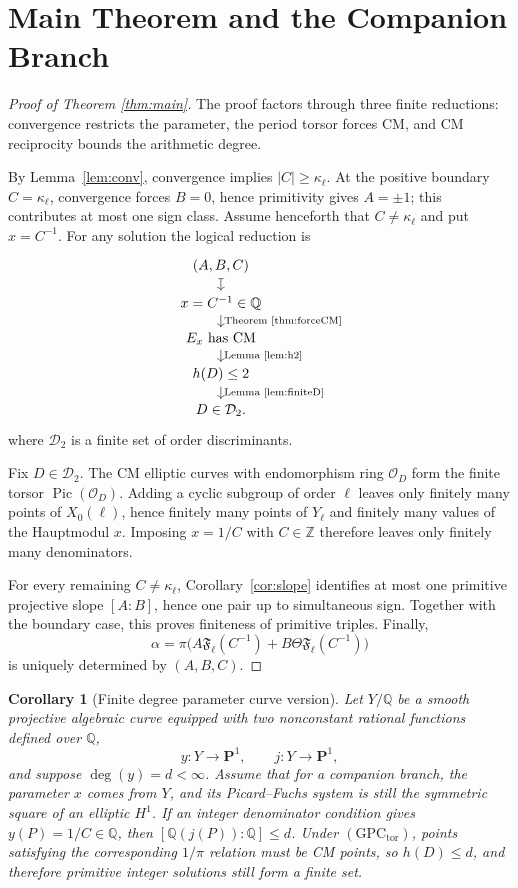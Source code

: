 \documentclass[11pt,a4paper]{amsart} %
\newtheorem{corollary}[theorem]{Corollary}
\theoremstyle{definition}
\newcommand{\Q}{\mathbb Q}
\newcommand{\Z}{\mathbb Z}
\newcommand{\Pic}{\operatorname{Pic}}
\begin{document}
\section{Main Theorem and the Companion Branch}

\begin{proof}[Proof of Theorem \ref{thm:main}]
The proof factors through three finite reductions: convergence restricts the
parameter, the period torsor forces CM, and CM reciprocity bounds the
arithmetic degree.

By Lemma~\ref{lem:conv}, convergence implies \(|C|\ge\kappa_\ell\). At the
positive boundary \(C=\kappa_\ell\), convergence forces \(B=0\), hence
primitivity gives \(A=\pm1\); this contributes at most one sign class.
Assume henceforth that \(C\ne\kappa_\ell\) and put \(x=C^{-1}\). For any
solution the logical reduction is
\[
\begin{tikzcd}[row sep=small]
(A,B,C) \arrow[d,mapsto]\\
x=C^{-1}\in\Q
  \arrow[d,"\text{Theorem~\ref{thm:forceCM}}"]\\
E_x\ \text{has CM}
  \arrow[d,"\text{Lemma~\ref{lem:h2}}"]\\
h(D)\le2
  \arrow[d,"\text{Lemma~\ref{lem:finiteD}}"]\\
D\in\mathcal D_2 .
\end{tikzcd}
\]
where \(\mathcal D_2\) is a finite set of order discriminants.

Fix \(D\in\mathcal D_2\). The CM elliptic curves with endomorphism ring
\(\mathcal O_D\) form the finite torsor \(\Pic(\mathcal O_D)\). Adding a
cyclic subgroup of order \(\ell\) leaves only finitely many points of
\(X_0(\ell)\), hence finitely many points of \(Y_\ell\) and finitely many
values of the Hauptmodul \(x\). Imposing \(x=1/C\) with \(C\in\Z\) therefore
leaves only finitely many denominators.

For every remaining \(C\ne\kappa_\ell\), Corollary~\ref{cor:slope} identifies
at most one primitive projective slope \([A:B]\), hence one pair up to
simultaneous sign. Together with the boundary case, this proves finiteness of
primitive triples. Finally,
\[
\alpha=\pi\bigl(A{\mathfrak F}_\ell(C^{-1})
+B\Theta{\mathfrak F}_\ell(C^{-1})\bigr)
\]
is uniquely determined by \((A,B,C)\).
\end{proof}

\begin{corollary}[Finite degree parameter curve version]\label{cor:companion}
Let \(Y/\Q\) be a smooth projective algebraic curve equipped with two nonconstant rational functions defined over \(\Q\),
\[
y:Y\to\mathbf P^1,\qquad j:Y\to\mathbf P^1,
\]
and suppose \(\deg(y)=d<\infty\). Assume that for a companion branch, the parameter \(x\) comes from \(Y\), and its Picard--Fuchs system is still the symmetric square of an elliptic \(H^1\).
If an integer denominator condition gives $y(P)=1/C\in\Q$, then $[\Q(j(P)):\Q]\le d$. Under \((\mathrm{GPC}_{\mathrm{tor}})\), points satisfying the corresponding \(1/\pi\) relation must be CM points, so $h(D)\le d$, and therefore primitive integer solutions still form a finite set.
\end{corollary}
\end{document}
